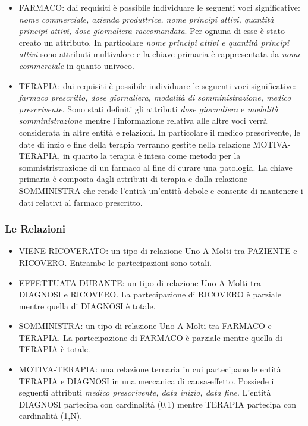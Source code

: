 \documentclass{article}
\begin{document}
\begin{itemize}
	\item FARMACO: dai requisiti è possibile individuare le seguenti voci
	      significative: \textit{nome commerciale, azienda produttrice,
		      nome principi attivi, quantità principi attivi, dose giornaliera
		      raccomandata}. Per ognuna di esse è stato creato un attributo. In
	      particolare \textit{nome principi attivi e quantità principi
		      attivi} sono attributi multivalore e la chiave primaria è
	      rappresentata da \textit{nome commerciale} in quanto univoco.

	\item TERAPIA: dai requisiti è possibile individuare le seguenti voci
	      significative: \textit{farmaco prescritto, dose giornaliera,
		      modalità di somministrazione, medico prescrivente}.
	      Sono stati definiti gli attributi \textit{dose giornaliera} e
	      \textit{modalità somministrazione} mentre l'informazione relativa
	      alle altre voci verrà considerata in altre entità e relazioni.
	      In particolare il medico prescrivente, le date di inzio e fine
	      della terapia verranno gestite nella relazione MOTIVA-TERAPIA,
	      in quanto la terapia è intesa come metodo per la sommistristrazione
	      di un farmaco al fine di curare una patologia. La
	      chiave primaria è composta dagli attributi di terapia e dalla
	      relazione SOMMINISTRA che rende l'entità un'entità debole e consente
	      di mantenere i dati relativi al farmaco prescritto.



\end{itemize}

\subsubsection{Le Relazioni}
\begin{itemize}
	\item VIENE-RICOVERATO: un tipo di relazione Uno-A-Molti tra PAZIENTE e
	      RICOVERO. Entrambe le partecipazioni sono totali.

	\item EFFETTUATA-DURANTE: un tipo di relazione Uno-A-Molti tra DIAGNOSI
	      e RICOVERO. La partecipazione di RICOVERO è parziale mentre quella
	      di DIAGNOSI è totale.

	\item SOMMINISTRA: un tipo di relazione Uno-A-Molti tra FARMACO e TERAPIA.
	      La partecipazione di FARMACO è parziale mentre quella di
	      TERAPIA è totale.

	\item MOTIVA-TERAPIA: una relazione ternaria in cui partecipano le entità
	      TERAPIA e DIAGNOSI in una meccanica di causa-effetto. Possiede i
	      seguenti attributi \textit{medico prescrivente, data inizio, data  fine}.
	      L'entità DIAGNOSI partecipa con cardinalità (0,1) mentre TERAPIA
	      partecipa con cardinalità (1,N).
\end{itemize}
\end{document}
